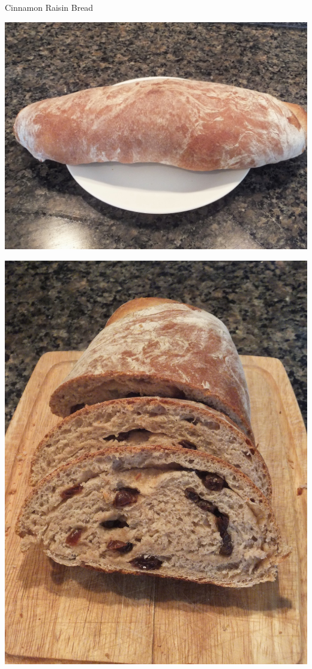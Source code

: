 \documentclass{recipe}
\begin{document}
\begin{recipe}{Cinnamon Raisin Bread}

  \begin{ingredients}
  \end{ingredients}

  \begin{images}
    \begin{image}
      \includegraphics[width=\linewidth,trim=0px 0px 0px 0px, clip=true]{cinamon_raisin_bread-01.jpeg}
    \end{image}

    \begin{image}
      \includegraphics[width=0.75\linewidth,trim=0px 0px 0px 0px, clip=true]{cinamon_raisin_bread-02.jpeg}
    \end{image}
  \end{images}


\end{recipe}
\end{document}
